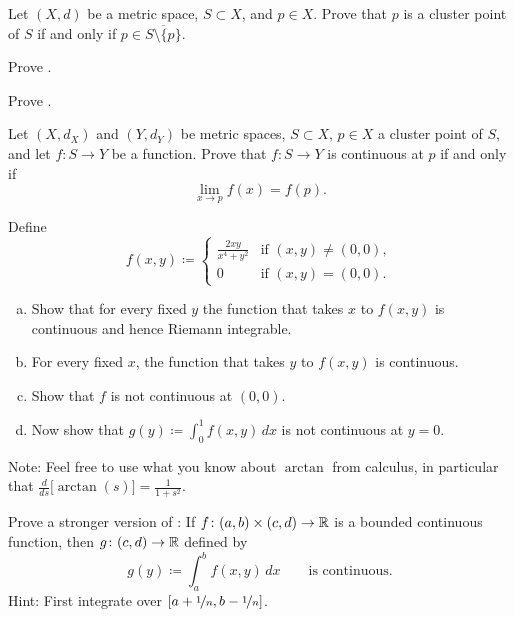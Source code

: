 \begin{exercise}
Let $(X,d)$ be a metric space, $S \subset X$, and $p \in X$.  Prove that
$p$ is a cluster point of $S$ if and only if $p \in \overline{S \setminus \{
p \}}$.
\end{exercise}

\begin{exercise}
Prove .
\end{exercise}

\begin{exercise}
Prove .
\end{exercise}

\begin{exercise}
Let $(X,d_X)$ and $(Y,d_Y)$ be metric spaces, $S \subset X$, $p \in X$
a cluster point of $S$, and let $f \colon S \to Y$ be a function.
Prove that
$f \colon S \to Y$ is continuous at $p$ if and only if
\begin{equation*}
\lim_{x \to p} f(x) = f(p) .
\end{equation*}
\end{exercise}

\begin{exercise}
Define
\begin{equation*}
f(x,y) \coloneqq
\begin{cases}
\frac{2xy}{x^4+y^2} & \text{if } (x,y) \neq (0,0), \\
0 & \text{if } (x,y) = (0,0) .
\end{cases}
\end{equation*}
\begin{enumerate}[a)]
\item
Show that for every fixed $y$ the function that takes $x$ to $f(x,y)$
is continuous and hence Riemann integrable.
\item
For every fixed $x$, the function that takes $y$ to $f(x,y)$ is continuous.
\item
Show that $f$ is not continuous at $(0,0)$.
\item
Now show that $g(y) \coloneqq \int_0^1 f(x,y)\,dx$ is not continuous at $y=0$.
\end{enumerate}
Note: Feel free to use what you know about $\arctan$ from calculus,
in particular that $\frac{d}{ds} \bigl[ \arctan(s) \bigr] = \frac{1}{1+s^2}$.
\end{exercise}

\begin{exercise} \label{exercise:integralcontcontextra}
Prove a stronger version of :
If $f \colon (a,b) \times (c,d) \to {\mathbb{R}}$ is a bounded continuous function,
then $g \colon (c,d) \to {\mathbb{R}}$ defined by
\begin{equation*}
g(y) \coloneqq \int_a^b f(x,y) \,dx  \qquad \text{is continuous}.
\end{equation*}
Hint: First integrate over $[a+\nicefrac{1}{n},b-\nicefrac{1}{n}]$.
\end{exercise}

